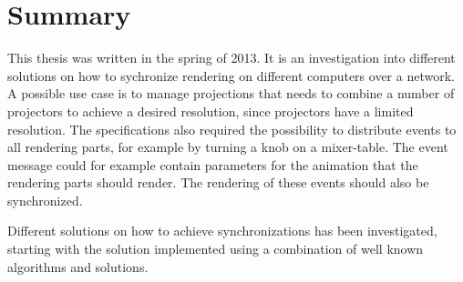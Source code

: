 \chapter{Summary}

This thesis was written in the spring of 2013. It is an investigation into different solutions on how to sychronize rendering on different computers over a network. A possible use case is to manage projections that needs to combine a number of projectors to achieve a desired resolution, since projectors have a limited resolution. The specifications also required the possibility to distribute events to all rendering parts, for example by turning a knob on a mixer-table. The event message could for example contain parameters for the animation that the rendering parts should render. The rendering of these events should also be synchronized. 

Different solutions on how to achieve synchronizations has been investigated, starting with the solution implemented using a combination of well known algorithms and solutions. 
